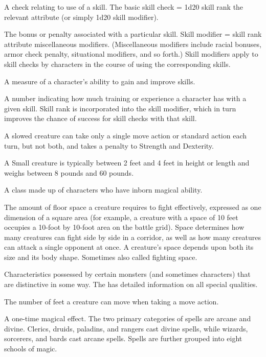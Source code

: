  A check relating to use of a skill. The basic skill 
check = 1d20 \add skill rank \add the relevant attribute (or simply 
1d20 \add skill modifier). 

 The bonus or penalty associated with a particular 
skill. Skill modifier = skill rank \add attribute \add miscellaneous 
modifiers. (Miscellaneous modifiers include racial bonuses, armor 
check penalty, situational modifiers, and so forth.) Skill modifiers 
apply to skill checks by characters in the course of using the 
corresponding skills. 

 A measure of a character's ability to gain and 
improve skills.

 A number indicating how much training or experience a character has with a given skill. Skill rank is incorporated 
into the skill modifier, which in turn improves the chance of 
success for skill checks with that skill. 

 A slowed creature can take only a single move action or standard action each turn, but not both, and takes a  penalty to Strength and Dexterity.

 A Small creature is typically between 2 feet and 4 feet in 
height or length and weighs between 8 pounds and 60 pounds. 

 A class made up of characters who have inborn 
magical ability. 

 The amount of floor space a creature requires to fight 
effectively, expressed as one dimension of a square area (for 
example, a creature with a space of 10 feet occupies a 10-foot by 10-foot area on the battle grid). Space determines how many creatures 
can fight side by side in a corridor, as well as how many creatures 
can attack a single opponent at once. A creature's space depends 
upon both its size and its body shape. Sometimes also called fighting 
space. 

 Characteristics possessed by certain monsters 
(and sometimes characters) that are distinctive in some way. The 
 has detailed information on all special qualities. 

 The number of feet a creature can move when taking a 
move action. 

 A one-time magical effect. The two primary categories of 
spells are arcane and divine. Clerics, druids, paladins, and rangers 
cast divine spells, while wizards, sorcerers, and bards cast arcane 
spells. Spells are further grouped into eight schools of magic. 

